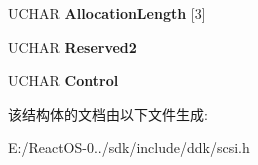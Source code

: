 \begin{DoxyCompactItemize}
U\+C\+H\+AR {\bfseries Allocation\+Length} \mbox{[}3\mbox{]}
\item 
\mbox{\label{struct___c_d_b_1_1___r_e_q_u_e_s_t___v_o_l_u_m_e___e_l_e_m_e_n_t___a_d_d_r_e_s_s_a0a3728a8baff1fbff0fceec8bb3d4144}} 
U\+C\+H\+AR {\bfseries Reserved2}
\item 
\mbox{\label{struct___c_d_b_1_1___r_e_q_u_e_s_t___v_o_l_u_m_e___e_l_e_m_e_n_t___a_d_d_r_e_s_s_a0fed8b352abe97ecb680b9c592ffa70e}} 
U\+C\+H\+AR {\bfseries Control}
\end{DoxyCompactItemize}


该结构体的文档由以下文件生成\+:\begin{DoxyCompactItemize}
\item 
E\+:/\+React\+O\+S-\/0../sdk/include/ddk/scsi.\+h\end{DoxyCompactItemize}
